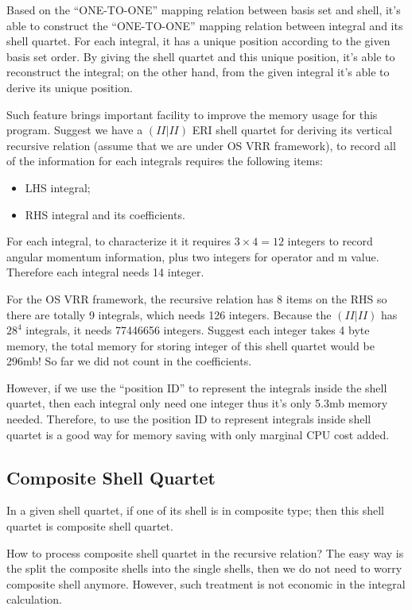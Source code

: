 Based on the ``ONE-TO-ONE'' mapping relation between basis set 
and shell, it's able to construct the ``ONE-TO-ONE'' mapping relation
between integral and its shell quartet. For each integral, it 
has a unique position according to the given basis set order. 
By giving the shell quartet and this unique position, it's able 
to reconstruct the integral; on the other hand, from the given 
integral it's able to derive its unique position.

Such feature brings important facility to improve the memory 
usage for this program. Suggest we have a $(II|II)$ ERI shell 
quartet for deriving its vertical recursive relation (assume
that we are under OS VRR framework), to record
all of the information for each integrals requires the following 
items:
\begin{itemize}
 \item LHS integral;
 \item RHS integral and its coefficients.
\end{itemize}

For each integral, to characterize it it requires $3\times 4 = 12$
integers to record angular momentum information, plus two integers
for operator and m value. Therefore each integral needs 14 integer.

For the OS VRR framework, the recursive relation has 8 items on the 
RHS so there are totally 9 integrals, which needs 126 integers. 
Because the $(II|II)$ has $28^4$ integrals, it needs 77446656 integers.
Suggest each integer takes 4 byte memory, the total memory for 
storing integer of this shell quartet would be 296mb! So far we did not
count in the coefficients.

However, if we use the ``position ID'' to represent the integrals 
inside the shell quartet, then each integral only need one integer 
thus it's only 5.3mb memory needed. Therefore, to use the position 
ID to represent integrals inside shell quartet is a good way for 
memory saving with only marginal CPU cost added.

\subsection{Composite Shell Quartet}
%
%
\label{composite_shell_quartet}

In a given shell quartet, if one of its shell is in composite type; 
then this shell quartet is composite shell quartet. 

How to process composite shell quartet in the recursive relation?
The easy way is the split the composite shells into the single 
shells, then we do not need to worry composite shell anymore. However,
such treatment is not economic in the integral calculation.

